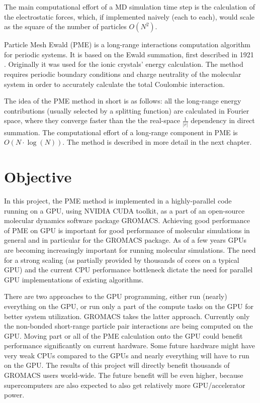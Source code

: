\documentclass[12pt,a4paper]{report}
\begin{document}
The main computational effort of a MD simulation time step is the calculation of the electrostatic forces, which, if implemented naively (each to each), would scale as the square of the number of particles $O(N^2)$.

Particle Mesh Ewald (PME) is a long-range interactions computation algorithm for periodic systems. It is based on the Ewald summation, first described in 1921 \cite{ewald}. Originally it was used for the ionic crystals' energy calculation. The method requires periodic boundary conditions and charge neutrality of the molecular system in order to accurately calculate the total Coulombic interaction. 

The idea of the PME method in short is as follows: all the long-range energy contributions (usually selected by a splitting function) are calculated in Fourier space, where they converge faster than the the real-space $\frac{1}{\lvert r\rvert}$ dependency in direct summation. The computational effort of a long-range component in PME is $ O(N\cdot\log(N))$. The method is described in more detail in the next chapter.
 
\section{Objective} 
 
In this project, the PME method is implemented in a highly-parallel code running on a GPU, using NVIDIA CUDA toolkit, as a part of an open-source molecular dynamics software package GROMACS. 
Achieving good performance of PME on GPU is important for good performance of molecular simulations in general and in particular for the GROMACS package. As of a few years GPUs are becoming increasingly important for running molecular simulations. The need for a strong scaling (as partially provided by thousands of cores on a typical GPU) and the current CPU performance bottleneck dictate the need for parallel GPU implementations of existing algorithms.

There are two approaches to the GPU programming, either run (nearly) everything on the GPU, or run only a part of the compute tasks on the GPU for better system utilization. GROMACS takes the latter approach. Currently only the non-bonded short-range particle pair interactions are being computed on the GPU. Moving part or all of the PME calculation onto the GPU could benefit performance significantly on current hardware. Some future hardware might have very weak CPUs compared to the GPUs and nearly everything will have to run on the GPU. The results of this project will directly benefit thousands of GROMACS users world-wide. The future benefit will be even higher, because supercomputers are also expected to also get relatively more GPU/accelerator power.
\end{document}
